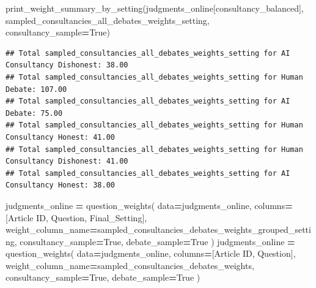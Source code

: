 \documentclass[
]{article}
\newenvironment{Shaded}{\begin{snugshade}}{\end{snugshade}}
\newcommand{\NormalTok}[1]{#1}
\newcommand{\OperatorTok}[1]{\textcolor[rgb]{0.81,0.36,0.00}{\textbf{#1}}}
\newcommand{\StringTok}[1]{\textcolor[rgb]{0.31,0.60,0.02}{#1}}
\newcommand{\VariableTok}[1]{\textcolor[rgb]{0.00,0.00,0.00}{#1}}
\begin{document}
\begin{Shaded}
\begin{Highlighting}[]
\NormalTok{print\_weight\_summary\_by\_setting(judgments\_online[consultancy\_balanced], }\StringTok{\textquotesingle{}sampled\_consultancies\_all\_debates\_weights\_setting\textquotesingle{}}\NormalTok{, consultancy\_sample}\OperatorTok{=}\VariableTok{True}\NormalTok{)}
\end{Highlighting}
\end{Shaded}

\begin{verbatim}
## Total sampled_consultancies_all_debates_weights_setting for AI Consultancy Dishonest: 38.00
## Total sampled_consultancies_all_debates_weights_setting for Human Debate: 107.00
## Total sampled_consultancies_all_debates_weights_setting for AI Debate: 75.00
## Total sampled_consultancies_all_debates_weights_setting for Human Consultancy Honest: 41.00
## Total sampled_consultancies_all_debates_weights_setting for Human Consultancy Dishonest: 41.00
## Total sampled_consultancies_all_debates_weights_setting for AI Consultancy Honest: 38.00
\end{verbatim}

\begin{Shaded}
\begin{Highlighting}[]

\NormalTok{judgments\_online }\OperatorTok{=}\NormalTok{ question\_weights(}
\NormalTok{    data}\OperatorTok{=}\NormalTok{judgments\_online, }
\NormalTok{    columns}\OperatorTok{=}\NormalTok{[}\StringTok{\textquotesingle{}Article ID\textquotesingle{}}\NormalTok{, }\StringTok{\textquotesingle{}Question\textquotesingle{}}\NormalTok{, }\StringTok{\textquotesingle{}Final\_Setting\textquotesingle{}}\NormalTok{], }
\NormalTok{    weight\_column\_name}\OperatorTok{=}\StringTok{\textquotesingle{}sampled\_consultancies\_debates\_weights\_grouped\_setting\textquotesingle{}}\NormalTok{,}
\NormalTok{    consultancy\_sample}\OperatorTok{=}\VariableTok{True}\NormalTok{,}
\NormalTok{    debate\_sample}\OperatorTok{=}\VariableTok{True}
\NormalTok{)}
\NormalTok{judgments\_online }\OperatorTok{=}\NormalTok{ question\_weights(}
\NormalTok{    data}\OperatorTok{=}\NormalTok{judgments\_online, }
\NormalTok{    columns}\OperatorTok{=}\NormalTok{[}\StringTok{\textquotesingle{}Article ID\textquotesingle{}}\NormalTok{, }\StringTok{\textquotesingle{}Question\textquotesingle{}}\NormalTok{], }
\NormalTok{    weight\_column\_name}\OperatorTok{=}\StringTok{\textquotesingle{}sampled\_consultancies\_debates\_weights\textquotesingle{}}\NormalTok{,}
\NormalTok{    consultancy\_sample}\OperatorTok{=}\VariableTok{True}\NormalTok{,}
\NormalTok{    debate\_sample}\OperatorTok{=}\VariableTok{True}
\NormalTok{)}
\end{Highlighting}
\end{Shaded}
\end{document}
